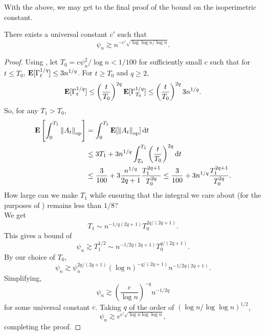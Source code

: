 		With the above, we may get to the final proof of the bound on the isoperimetric constant.

		\begin{ftheo}
			There exists a universal constant $c'$ such that
			\[ \psi_n \gtrsim n^{-c'\sqrt{\log \log n / \log n}}. \]
		\end{ftheo}
		\begin{proof}
			Using  , let $T_0 = c \psi_n^2 / \log n < 1 / 100$ for sufficiently small $c$ such that for $t\leq T_0$, $\textbf{E}[\Gamma_t^{1/q}] \leq 3n^{1/q}$. For $t \geq T_0$ and $q \geq 2$,
			\[ \textbf{E}[\Gamma_t^{1/q}] \leq \left(\frac{t}{T_0}\right)^{2q} \textbf{E}[\Gamma_{T_0}^{1/q}] \leq \left(\frac{t}{T_0}\right)^{2q} 3n^{1/q}. \]
			So, for any $T_1 > T_0$,
			\begin{align*}
				\textbf{E}\left[ \int_0^{T_1} \left\lVert A_t\right\rVert_{\text{op}} \right] &= \int_0^{T_1} \textbf{E}[\left\lVert A_t\right\rVert_{\text{op}}] \operatorname{d}\!{t} \\
					&\leq 3T_1 + 3n^{1/q} \int_{T_0}^{T_1} \left(\frac{t}{T_0}\right)^{2q} \operatorname{d}\!{t} \\
					&\leq \frac{3}{100} + 3 \frac{ n^{1/q} }{2q+1} \frac{T_1^{2q+1}}{T_0^{2q}} \leq \frac{3}{100} + 3 n^{1/q} \frac{T_1^{2q+1}}{T_0^{2q}}.
			\end{align*}
			How large can we make $T_1$ while ensuring that the integral we care about (for the purposes of ) remains less than $1/8$?\\
			We get
			\[ T_1 \sim n^{-1/q(2q+1)} T_0^{2q/(2q+1)}. \]
			This gives a bound of
			\[ \psi_n \gtrsim T_1^{1/2} \sim n^{-1/2q(2q+1)} T_0^{q/(2q+1)}. \]
			By our choice of $T_0$,
			\[ \psi_n \gtrsim \psi_n^{2q/(2q+1)} (\log n)^{-q/(2q+1)} n^{-1/2q(2q+1)}. \]
			Simplifying,
			\[ \psi_n \gtrsim \left(\frac{c}{\log n}\right)^{-q} n^{-1/2q} \]
			for some universal constant $c$. Taking $q$ of the order of $\left(\log n / \log \log n\right)^{1/2}$,
			\[ \psi_n \gtrsim e^{c' \sqrt{\log n \log \log n} }, \]
			completing the proof.
		\end{proof}



